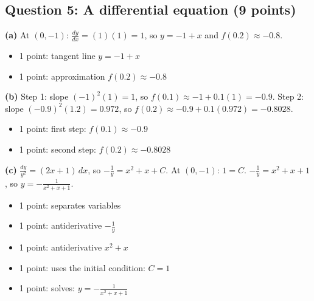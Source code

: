 \documentclass{apcalc}
\begin{document}
\subsection*{Question 5: A differential equation (9 points)}
\textbf{(a)} At $(0,-1)$: $\frac{dy}{dx}=(1)(1)=1$, so $y=-1+x$ and $f(0.2)\approx-0.8$.
\begin{itemize}[leftmargin=1.6em,itemsep=0pt]
\item 1 point: tangent line $y=-1+x$
\item 1 point: approximation $f(0.2)\approx-0.8$
\end{itemize}
\textbf{(b)} Step 1: slope $(-1)^2(1)=1$, so $f(0.1)\approx-1+0.1(1)=-0.9$. Step 2: slope $(-0.9)^2(1.2)=0.972$, so $f(0.2)\approx-0.9+0.1(0.972)=-0.8028$.
\begin{itemize}[leftmargin=1.6em,itemsep=0pt]
\item 1 point: first step: $f(0.1)\approx-0.9$
\item 1 point: second step: $f(0.2)\approx-0.8028$
\end{itemize}
\textbf{(c)} $\frac{dy}{y^2}=(2x+1)\,dx$, so $-\frac1y=x^2+x+C$. At $(0,-1)$: $1=C$. $-\frac1y=x^2+x+1$, so $y=-\frac{1}{x^2+x+1}$.
\begin{itemize}[leftmargin=1.6em,itemsep=0pt]
\item 1 point: separates variables
\item 1 point: antiderivative $-\frac1y$
\item 1 point: antiderivative $x^2+x$
\item 1 point: uses the initial condition: $C=1$
\item 1 point: solves: $y=-\frac{1}{x^2+x+1}$
\end{itemize}
\end{document}
